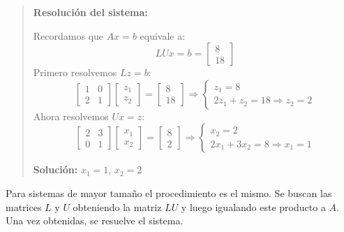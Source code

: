 \begin{quote}
  \textbf{Resolución del sistema:}

  Recordamos que \(Ax = b\) equivale a:
  \[
  LUx = b = \begin{bmatrix} 8 \\ 18 \end{bmatrix}
  \]
  Primero resolvemos \(Lz = b\):
  \[
  \begin{bmatrix}
  1 & 0 \\
  2 & 1
  \end{bmatrix}
  \begin{bmatrix}
  z_1 \\
  z_2
  \end{bmatrix}
  =
  \begin{bmatrix}
  8 \\
  18
  \end{bmatrix}
  \Rightarrow
  \begin{cases}
  z_1 = 8 \\
  2z_1 + z_2 = 18 \Rightarrow z_2 = 2
  \end{cases}
  \]
  Ahora resolvemos \(Ux = z\):
  \[
  \begin{bmatrix}
  2 & 3 \\
  0 & 1
  \end{bmatrix}
  \begin{bmatrix}
  x_1 \\
  x_2
  \end{bmatrix}
  =
  \begin{bmatrix}
  8 \\
  2
  \end{bmatrix}
  \Rightarrow
  \begin{cases}
  x_2 = 2 \\
  2x_1 + 3x_2 = 8 \Rightarrow x_1 = 1
  \end{cases}
  \]

  \textbf{Solución:} \(x_1 = 1\), \(x_2 = 2\)
\end{quote}

Para sistemas de mayor tamaño el procedimiento es el mismo. Se buscan las matrices \(L\) y \(U\) obteniendo la matriz \(LU\) y luego igualando este producto a \(A\). Una vez obtenidas, se resuelve el sistema.